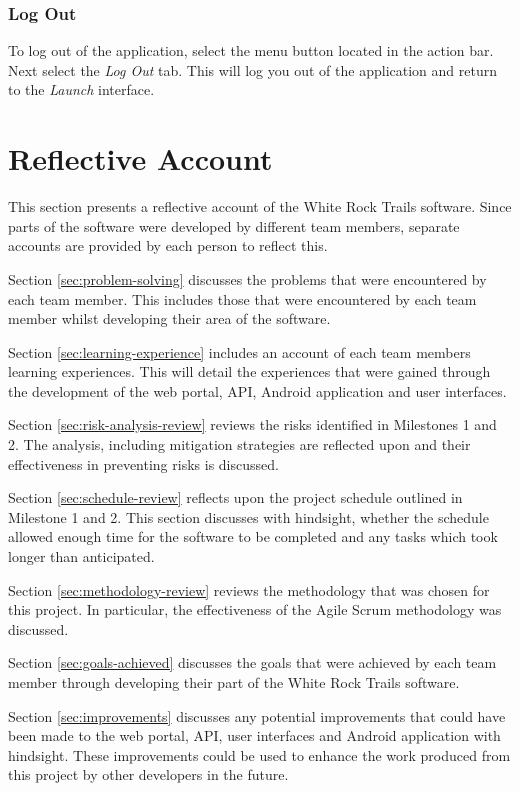 \documentclass[11pt,a4paper]{report}
\begin{document}
\subsection{Log Out}
\label{log_out}

To log out of the application, select the menu button located in the action bar. Next select the \emph{Log Out} tab. This will log you out of the application and return to the \emph{Launch} interface.



\chapter{Reflective Account}
\label{sec:reflective-account}

This section presents a reflective account of the White Rock Trails software. Since parts of the software were developed by different team members, separate accounts are provided by each person to reflect this.

Section \ref{sec:problem-solving} discusses the problems that were encountered by each team member. This includes those that were encountered by each team member whilst developing their area of the software.

Section \ref{sec:learning-experience} includes an account of each team members learning experiences. This will detail the experiences that were gained through the development of the web portal, API, Android application and user interfaces.

Section \ref{sec:risk-analysis-review} reviews the risks identified in Milestones 1 and 2. The analysis, including mitigation strategies are reflected upon and their effectiveness in preventing risks is discussed.

Section \ref{sec:schedule-review} reflects upon the project schedule outlined in Milestone 1 and 2. This section discusses with hindsight, whether the schedule allowed enough time for the software to be completed and any tasks which took longer than anticipated.

Section \ref{sec:methodology-review} reviews the methodology that was chosen for this project. In particular, the effectiveness of the Agile Scrum methodology was discussed.

Section \ref{sec:goals-achieved} discusses the goals that were achieved by each team member through developing their part of the White Rock Trails software.

Section \ref{sec:improvements} discusses any potential improvements that could have been made to the web portal, API, user interfaces and Android application with hindsight. These improvements could be used to enhance the work produced from this project by other developers in the future.
\end{document}
